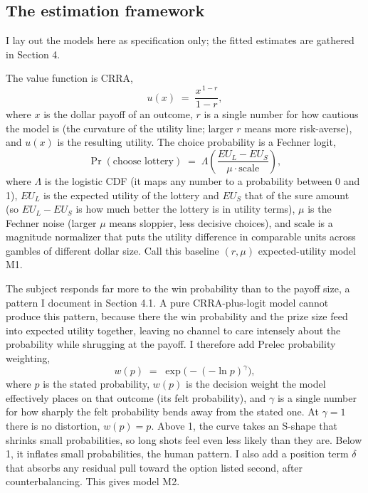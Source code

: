 \documentclass[11pt]{article}
\begin{document}
\subsection{The estimation framework}

I lay out the models here as specification only; the fitted estimates are gathered in Section 4.

The value function is CRRA,
\[
  u(x) \;=\; \frac{x^{\,1-r}}{1-r},
\]
where $x$ is the dollar payoff of an outcome, $r$ is a single number for how cautious the model is (the
curvature of the utility line; larger $r$ means more risk-averse), and $u(x)$ is the resulting utility.
The choice probability is a Fechner logit,
\[
  \Pr(\text{choose lottery}) \;=\; \Lambda\!\left(\frac{EU_L - EU_S}{\mu \cdot \text{scale}}\right),
\]
where $\Lambda$ is the logistic CDF (it maps any number to a probability between 0 and 1), $EU_L$ is the
expected utility of the lottery and $EU_S$ that of the sure amount (so $EU_L - EU_S$ is how much better
the lottery is in utility terms), $\mu$ is the Fechner noise (larger $\mu$ means sloppier, less decisive
choices), and $\text{scale}$ is a magnitude normalizer that puts the utility difference in comparable
units across gambles of different dollar size. Call this baseline $(r, \mu)$ expected-utility model M1.

The subject responds far more to the win probability than to the payoff size, a pattern I document in
Section 4.1. A pure CRRA-plus-logit model cannot produce this pattern, because there the win probability
and the prize size feed into expected utility together, leaving no channel to care intensely about the
probability while shrugging at the payoff. I therefore add Prelec probability weighting,
\[
  w(p) \;=\; \exp\!\big(-(-\ln p)^{\gamma}\big),
\]
where $p$ is the stated probability, $w(p)$ is the decision weight the model effectively places on that
outcome (its felt probability), and $\gamma$ is a single number for how sharply the felt probability bends
away from the stated one. At $\gamma = 1$ there is no distortion, $w(p) = p$. Above 1, the curve takes an
S-shape that shrinks small probabilities, so long shots feel even less likely than they are. Below 1, it
inflates small probabilities, the human pattern. I also add a position term $\delta$ that absorbs any
residual pull toward the option listed second, after counterbalancing. This gives model M2.
\end{document}
